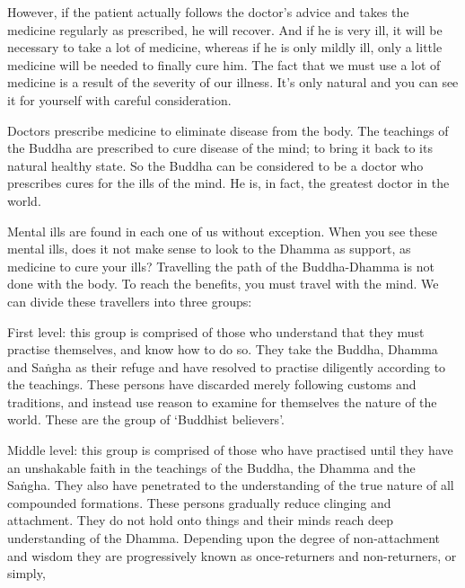 However, if the patient actually follows the doctor's advice and takes the medicine regularly as prescribed, he will recover. And if he is very ill, it will be necessary to take a lot of medicine, whereas if he is only mildly ill, only a little medicine will be needed to finally cure him. The fact that we must use a lot of medicine is a result of the severity of our illness. It's only natural and you can see it for yourself with careful consideration. 


Doctors prescribe medicine to eliminate disease from the body. The teachings of the Buddha are prescribed to cure disease of the mind; to bring it back to its natural healthy state. So the Buddha can be considered to be a doctor who prescribes cures for the ills of the mind. He is, in fact, the greatest doctor in the world. 

Mental ills are found in each one of us without exception. When you see these mental ills, does it not make sense to look to the Dhamma as support, as medicine to cure your ills? Travelling the path of the Buddha-Dhamma is not done with the body. To reach the benefits, you must travel with the mind. We can divide these travellers into three groups: 

First level: this group is comprised of those who understand that they must practise themselves, and know how to do so. They take the Buddha, Dhamma and Sa\.ngha as their refuge and have resolved to practise diligently according to the teachings. These persons have discarded merely following customs and traditions, and instead use reason to examine for themselves the nature of the world. These are the group of `Buddhist believers'. 

Middle level: this group is comprised of those who have practised until they have an unshakable faith in the teachings of the Buddha, the Dhamma and the Sa\.ngha. They also have penetrated to the understanding of the true nature of all compounded formations. These persons gradually reduce clinging and attachment. They do not hold onto things and their minds reach deep understanding of the Dhamma. Depending upon the degree of non-attachment and wisdom they are progressively known as  once-returners and non-returners, or simply,  

